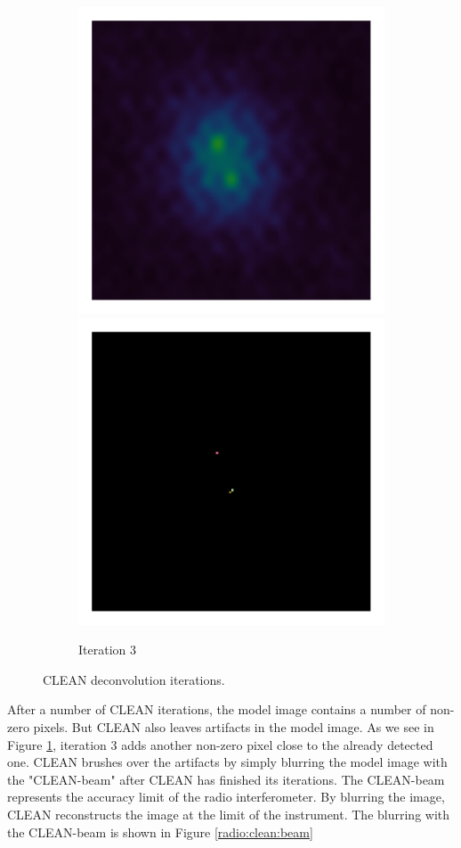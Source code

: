 \begin{figure}[h]
\begin{subfigure}[b]{0.48\linewidth}
		\includegraphics[width=0.48\linewidth, clip, trim= 1.0in 1.0in 1.0in 1.0in]{./chapters/01.intro/cleanExample/dirty_CLEAN_3.png}  \includegraphics[width=0.48\linewidth, clip, trim= 1.0in 1.0in 1.0in 1.0in]{./chapters/01.intro/cleanExample/model_CLEAN_3.png} 
		\caption{Iteration 3}
		\label{radio:clean:figure:iter3}
	\end{subfigure}

	\caption{CLEAN deconvolution iterations.}
	\label{radio:clean:figure}
\end{figure}

After a number of CLEAN iterations, the model image contains a number of non-zero pixels. But CLEAN also leaves artifacts in the model image. As we see in Figure \ref{radio:clean:figure:iter3}, iteration 3 adds another non-zero pixel close to the already detected one. CLEAN brushes over the artifacts by simply blurring the model image with the "CLEAN-beam" after CLEAN has finished its iterations. The CLEAN-beam represents the accuracy limit of the radio interferometer. By blurring the image, CLEAN reconstructs the image at the limit of the instrument. The blurring with the CLEAN-beam is shown in Figure \ref{radio:clean:beam}

